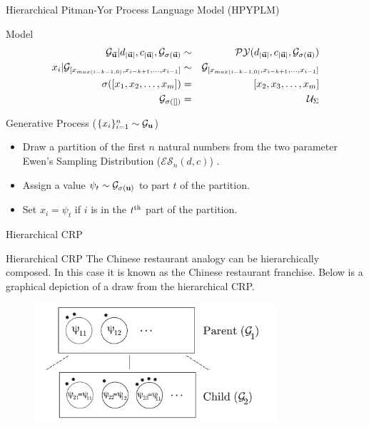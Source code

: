 \documentclass{beamer}
\newcommand{\G}{\mathcal{G}}
\newcommand{\PY}{\mathcal{P}\mathcal{Y}}
\newcommand{\ES}{\mathcal{E}\mathcal{S}}
\newcommand{\bu}{{\bf u}}
\begin{document}
\begin{frame}[t]{Hierarchical Pitman-Yor Process Language Model (HPYPLM)\cite{teh2006a}}

	\begin{block}{Model}
		\vspace{-.5cm}
		\begin{eqnarray*}
			\G_{\vec {\bf u}} | d_{| \vec \bu |}, c_{| \vec \bu |}, \G_{\sigma(\vec \bu)} &\sim& \PY(d_{| \vec \bu |}, c_{|\vec  \bu |}, \G_{\sigma(\vec \bu)}) \\
			x_i | \G_{[x_{max({i-k-1,0})}, x_{i-k+1}, \ldots, x_{i-1}]} &\sim& \G_{[x_{max({i-k-1,0})}, x_{i-k+1}, \ldots, x_{i-1}]}\\
			\sigma([x_1, x_2, \ldots, x_m]) &=& [x_2, x_3, \ldots, x_m]\\
			\G_{\sigma([])} &=& \mathcal{U}_\Sigma
		\end{eqnarray*}
	\end{block}
	
		\begin{block}{Generative Process ($\{x_i\}_{i = 1}^n \sim \G_\bu$)}
		\begin{itemize}
			\item Draw a partition of the first $n$ natural numbers from the two parameter Ewen's Sampling Distribution ($\ES_n(d,c)$) \cite{Ewens1995}.
			\item Assign a value $\psi_t \sim \G_{\sigma(\bu)}$ to part $t$ of the partition.
			\item Set $x_i = \psi_t$ if $i$ is in the $t^{\rm th}$ part of the partition.
		\end{itemize}
	\end{block}
\end{frame}

\begin{frame}[t]{Hierarchical CRP}

	\begin{block}{Hierarchical CRP}
		The Chinese restaurant analogy can be hierarchically composed.  In this case it is known as the Chinese restaurant franchise.  Below is a graphical depiction of a draw from the hierarchical CRP.
	\end{block}	
		\begin{figure}[t]
		\begin{center}
			\includegraphics[width = 9cm]{../figs/figure1.pdf}
		\end{center}
	\end{figure}
\end{frame}
\end{document}
